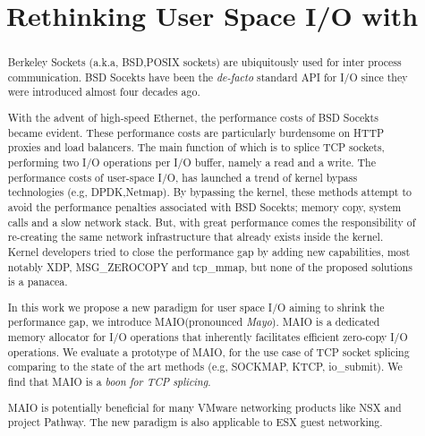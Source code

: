 \documentclass[newfonts=false,format=sigconf,9pt,letterpaper]{acmart}
\title{Rethinking User Space I/O with \oursys}
\newcommand{\oursys}{MAIO\xspace}
\newcommand{\sockets}{BSD Socekts\xspace}
\begin{document}
\begin{abstract}
    Berkeley Sockets (a.k.a, BSD,POSIX sockets) are ubiquitously used for inter process communication. \sockets have been the \emph{de-facto} standard API for I/O since they were introduced almost four decades ago. 
    
    With the advent of high-speed Ethernet, the performance costs of \sockets became evident. These performance costs are particularly burdensome on HTTP proxies and load balancers. The main function of which is to splice TCP sockets, performing two I/O operations per I/O buffer, namely a read and a write. The performance costs of user-space I/O, has launched a trend of kernel bypass technologies (e.g, DPDK,Netmap). By bypassing the kernel, these methods attempt to avoid the performance penalties associated with \sockets; memory copy, system calls and a slow network stack. But, with great performance comes the responsibility of re-creating the same network infrastructure that already exists inside the kernel. Kernel developers tried to close the performance gap by adding new capabilities, most notably XDP, MSG\_ZEROCOPY and tcp\_mmap, but none of the proposed solutions is a panacea.
    
    In this work we propose a new paradigm for user space I/O aiming to shrink the performance gap, we introduce \oursys (pronounced \emph{Mayo}). \oursys is a dedicated memory allocator for I/O operations that inherently facilitates efficient zero-copy I/O operations. We evaluate a prototype of \oursys, for the use case of TCP socket splicing comparing to  the state of the art methods (e.g, SOCKMAP, KTCP, io\_submit). We find that \oursys is a \emph{boon for TCP splicing}. 
    
    \oursys is potentially beneficial for many VMware networking products like NSX and project Pathway. The new paradigm is also applicable to ESX guest networking. 
    
    
\end{abstract}
\end{document}
